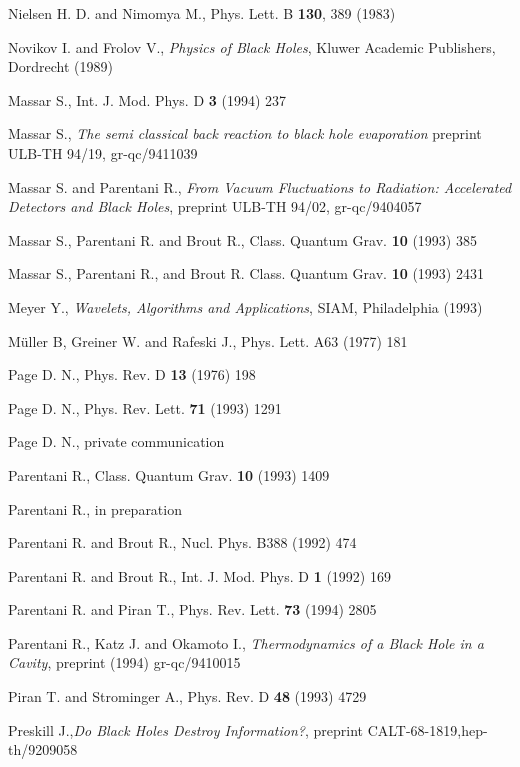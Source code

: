\documentclass[12pt,oneside]{report}
\begin{document}
{\begin{thebibliography}{999}
Nielsen H. D. and Nimomya M., Phys. Lett. 
B {\bf 130}, 389 (1983)


Novikov I. and Frolov V., {\em Physics of Black Holes}, Kluwer
Academic Publishers, Dordrecht (1989)

 Massar S., Int. J. Mod. Phys. D {\bf 3} (1994) 237

  Massar S., {\em The semi classical back reaction to black
hole evaporation} preprint ULB-TH 94/19, gr-qc/9411039

Massar S. and Parentani R., {\em From Vacuum Fluctuations to
Radiation: Accelerated Detectors and Black Holes}, preprint ULB-TH 94/02, gr-qc/9404057

Massar S., Parentani R. and Brout R., Class. Quantum Grav.
{\bf 10} (1993) 385

 Massar S., Parentani R., and Brout R. Class. Quantum Grav.
{\bf 10} (1993) 2431

Meyer Y., {\em Wavelets, Algorithms and Applications}, SIAM,
Philadelphia (1993)

M\"uller B, Greiner W. and Rafeski J., Phys. Lett. A63
(1977) 181 



 Page D. N., Phys. Rev. D {\bf 13} (1976) 198

 Page D. N., Phys. Rev. Lett. {\bf 71}  (1993) 1291 

 Page D. N., private communication

Parentani R., Class. Quantum Grav. {\bf 10} (1993) 1409

Parentani R., in preparation

Parentani R. and Brout R., Nucl. Phys. B388 (1992) 474


Parentani R. and Brout R., Int. J. Mod.
Phys. D {\bf 1 }(1992) 169

 Parentani R. and Piran T.,  Phys. Rev. Lett. {\bf 73} (1994) 2805 

 Parentani R., Katz J. and Okamoto I., 
{\em Thermodynamics of a Black Hole in a Cavity}, preprint (1994) gr-qc/9410015

 Piran T. and Strominger A., Phys. Rev. D {\bf 48} (1993) 4729


 Preskill J.,{\em Do Black Holes Destroy Information?},
preprint CALT-68-1819,hep-th/9209058


\end{thebibliography}}
\end{document}
